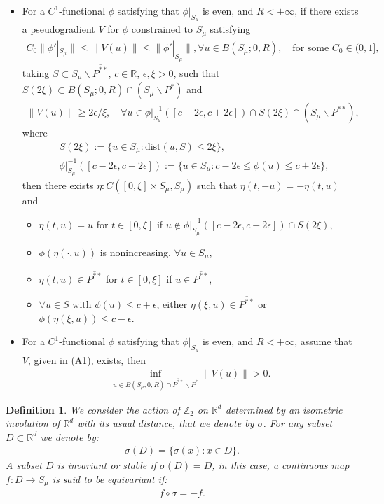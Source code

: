 \documentclass[10pt,a4paper]{article}
\newtheorem{definition}[theorem]{Definition}
\theoremstyle{definition} \theoremstyle{remark}
\numberwithin{equation}{section}
\newcommand{\R}{\mathbb{R}}
\newcommand{\ep}{\epsilon}
\begin{document}
\begin{itemize}
	\item[(A1)] For a $C^1$-functional $\phi$ satisfying that $\phi|_{S_\mu}$ is even, and $R < +\infty$, if there exists a pseudogradient $V$ for $\phi$ constrained to $S_\mu$ satisfying
	\begin{align} \label{eqC0}
		C_0\|\phi'|_{S_\mu}\| \leq \|V(u)\| \leq \|\phi'|_{S_\mu}\|, \forall u \in B(S_\mu;0,R), \quad \text{for some } C_0 \in (0,1],
	\end{align}
	taking $S \subset S_\mu \backslash \overline{P^{**}}$, $c \in \R$, $\ep, \xi > 0$, such that $S(2\xi) \subset B(S_\mu;0,R) \cap (S_\mu \backslash P^*)$ and
	\begin{align*}
		\|V(u)\| \geq 2\epsilon /\xi, \quad \forall u \in \phi|_{S_\mu}^{-1}([c-2\epsilon,c+2\epsilon]) \cap S(2\xi) \cap (S_\mu \backslash \overline{P^{**}}),
	\end{align*}
	where
	\begin{align*}
		& S(2\xi) := \bigl\{u \in S_\mu: \text{dist}(u,S) \leq 2\xi \bigr\}, \\
		& \phi|_{S_\mu}^{-1}([c-2\epsilon,c+2\epsilon]) := \bigl\{u \in S_\mu: c-2\epsilon \leq \phi(u) \leq c+2\epsilon \bigr\},
	\end{align*}
	then there exists $\eta: C([0,\xi] \times S_\mu, S_\mu)$ such that $\eta(t,-u) = -\eta(t,u)$ and
	\begin{itemize}
		\item[(i)] $\eta(t,u) = u$ for $t \in [0,\xi]$ if $u \notin \phi|_{S_\mu}^{-1}([c-2\epsilon,c+2\epsilon]) \cap S(2\xi)$,
		\item[(ii)] $\phi(\eta(\cdot,u))$ is nonincreasing, $\forall u \in S_\mu$,
		\item[(iii)] $\eta(t,u) \in \overline{P^{**}}$ for $t \in [0,\xi]$ if $u \in \overline{P^{**}}$,
		\item[(iv)] $\forall u \in S$ with $\phi(u) \leq c + \epsilon$, either $\eta(\xi,u) \in \overline{P^{**}}$ or $\phi(\eta(\xi,u)) \leq c -\epsilon$.
	\end{itemize}
	\item[(A2)] For a $C^1$-functional $\phi$ satisfying that $\phi|_{S_\mu}$ is even, and $R < +\infty$, assume that $V$, given in (A1), exists, then
	\begin{align*}
		\inf_{u \in B(S_\mu;0,R) \cap \overline{P^{**}} \backslash P^*}\|V(u)\| > 0.
	\end{align*}
\end{itemize}

\begin{definition}
	We consider the action of $\mathbb{Z}_2$ on $\R^d$ determined by an \emph{isometric} involution of $\R^d$ with its usual distance, that we denote by $\sigma$. For any subset $D \subset \R^d$ we denote by:
	\begin{align*}
		\sigma (D) = \bigl\{\sigma(x): x \in D\bigr\}.
	\end{align*}
	A subset $D$ is invariant or stable if $\sigma (D) = D$, in this case, a continuous map $f : D \to S_\mu$ is said to be equivariant if:
	\begin{align*}
		f \circ \sigma = -f.
	\end{align*}
\end{definition}
\end{document}
